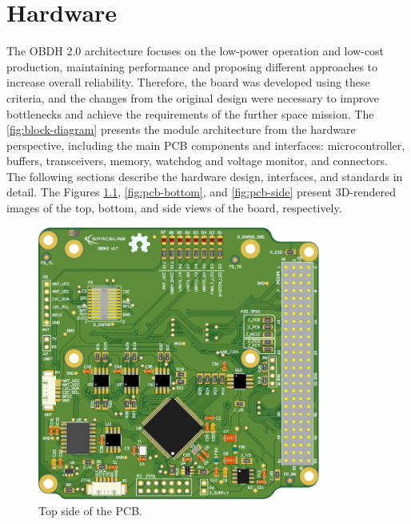 %
%
%
%
%

%
%
%
%
%
%

\chapter{Hardware} \label{ch:hardware}

The OBDH 2.0 architecture focuses on the low-power operation and low-cost production, maintaining performance and proposing different approaches to increase overall reliability. Therefore, the board was developed using these criteria, and the changes from the original design were necessary to improve bottlenecks and achieve the requirements of the further space mission. The \autoref{fig:block-diagram} presents the module architecture from the hardware perspective, including the main PCB components and interfaces: microcontroller, buffers, transceivers, memory, watchdog and voltage monitor, and connectors. The following sections describe the hardware design, interfaces, and standards in detail. The Figures \ref{fig:pcb-top}, \ref{fig:pcb-bottom}, and \ref{fig:pcb-side} present 3D-rendered images of the top, bottom, and side views of the board, respectively.

\begin{figure}[!ht]
    \begin{center}
        \includegraphics[width=93mm]{figures/obdh2-pcb-top.png}
        \caption{Top side of the PCB.}
        \label{fig:pcb-top}
    \end{center}
\end{figure}

